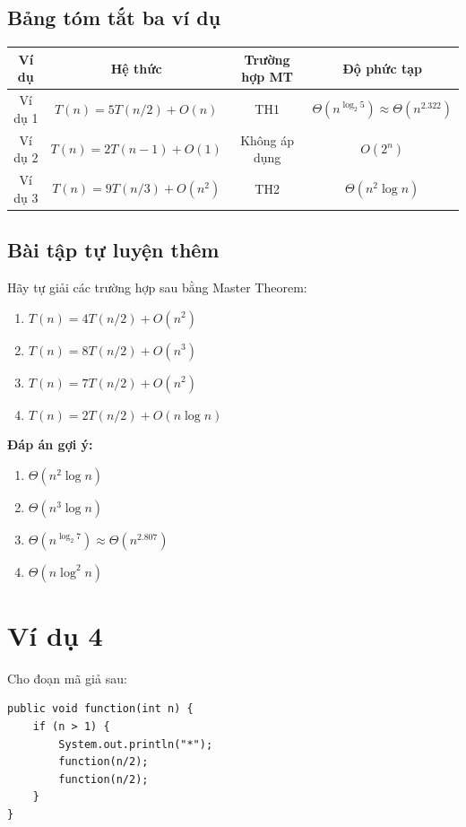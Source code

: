 \documentclass{article}
\begin{document}
\subsection{Bảng tóm tắt ba ví dụ}

\begin{tabular}{|c|c|c|c|}
\hline
\textbf{Ví dụ} & \textbf{Hệ thức} & \textbf{Trường hợp MT} & \textbf{Độ phức tạp} \\
\hline
Ví dụ 1 & \(T(n) = 5T(n/2) + O(n)\) & TH1 & \(\Theta(n^{\log_2 5}) \approx \Theta(n^{2.322})\) \\
\hline
Ví dụ 2 & \(T(n) = 2T(n-1) + O(1)\) & Không áp dụng & \(O(2^n)\) \\
\hline
Ví dụ 3 & \(T(n) = 9T(n/3) + O(n^2)\) & TH2 & \(\Theta(n^2 \log n)\) \\
\hline
\end{tabular}

\subsection{Bài tập tự luyện thêm}

Hãy tự giải các trường hợp sau bằng Master Theorem:

\begin{enumerate}
    \item \(T(n) = 4T(n/2) + O(n^2)\)
    \item \(T(n) = 8T(n/2) + O(n^3)\)
    \item \(T(n) = 7T(n/2) + O(n^2)\)
    \item \(T(n) = 2T(n/2) + O(n \log n)\)
\end{enumerate}

\textbf{Đáp án gợi ý:}
\begin{enumerate}
    \item \(\Theta(n^2 \log n)\)
    \item \(\Theta(n^3 \log n)\)
    \item \(\Theta(n^{\log_2 7}) \approx \Theta(n^{2.807})\)
    \item \(\Theta(n \log^2 n)\)
\end{enumerate}

\section{Ví dụ 4}

Cho đoạn mã giả sau:

\begin{verbatim}
public void function(int n) {
    if (n > 1) {
        System.out.println("*");
        function(n/2);
        function(n/2);
    }
}
\end{verbatim}
\end{document}
